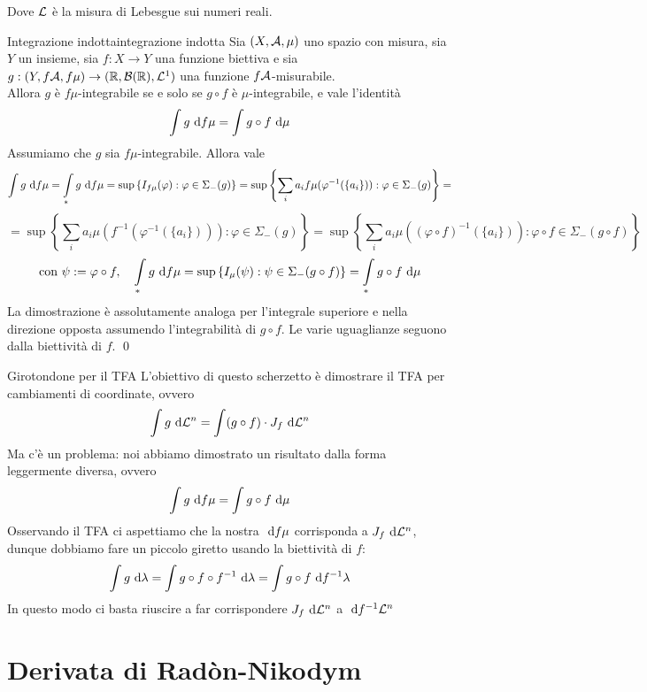 \documentclass{article}
\begin{document}
Dove $\mathcal{L}$ è la misura di Lebesgue sui numeri reali.

\begin{theorem}{Integrazione indotta}{integrazione indotta}
    Sia $(X,\mathcal{A},\mu)$ uno spazio con misura, sia $Y$ un insieme, sia $f:X\to Y$ una funzione biettiva e sia $g:(Y,f\mathcal{A},f\mu)\to (\mathbb{R},\mathcal{B}(\mathbb{R}),\mathcal{L}^1)$ una funzione $f\mathcal{A}$-misurabile.\\
    Allora $g$ è $f\mu$-integrabile se e solo se $g\circ f$ è $\mu$-integrabile, e vale l'identità
    \[\intop g \de f\mu = \intop g\circ f \de \mu\]
    \proof
    Assumiamo che $g$ sia $f\mu$-integrabile. Allora vale
    \[\intop g \de f\mu = \intop_* g \de f\mu = \sup\left\{I_{f\mu}(\varphi) : \varphi \in \Sigma_-(g)\right\}=\sup\left\{ \sum_i a_i f\mu(\varphi^{-1}(\{a_i\})) : \varphi \in \Sigma_-(g) \right\} =\]
    \[ = \sup\left\{ \sum_i a_i \mu(f^{-1}(\varphi^{-1}(\{a_i\}))) : \varphi \in \Sigma_-(g) \right\} = \sup\left\{ \sum_i a_i \mu((\varphi \circ f)^{-1}(\{a_i\})) : \varphi \circ f \in \Sigma_-(g\circ f) \right\}\]
    \[\text{con } \psi := \varphi \circ f, \quad \intop_* g \de f\mu =\sup\left\{ I_\mu(\psi) : \psi \in \Sigma_-(g\circ f) \right\} = \intop_* g \circ f \de \mu\]
    La dimostrazione è assolutamente analoga per l'integrale superiore e nella direzione opposta assumendo l'integrabilità di $g\circ f$. Le varie uguaglianze seguono dalla biettività di $f$.
    \qed
\end{theorem}

\begin{remark}{Girotondone per il TFA}{}
    L'obiettivo di questo scherzetto è dimostrare il TFA per cambiamenti di coordinate, ovvero
    \[\intop g \de \L^n = \intop (g \circ f)\cdot J_f \de \L^n  \]
    Ma c'è un problema: noi abbiamo dimostrato un risultato dalla forma leggermente diversa, ovvero 
    \[\intop g \de f\mu = \intop g\circ f \de \mu \]
    Osservando il TFA ci aspettiamo che la nostra $\text{ d} f\mu$ corrisponda a $J_f \text{ d} \mathcal{L}^n$, dunque dobbiamo fare un piccolo giretto usando la biettività di $f$:
    \[\intop g \de \lambda = \intop g \circ f \circ f^{-1} \de \lambda = \intop g \circ f \de f^{-1}\lambda\]
    In questo modo ci basta riuscire a far corrispondere $J_f \text{ d} \mathcal{L}^n$ a $\text{ d} f^{-1} \mathcal{L}^n$
\end{remark}

\pagebreak
\section{Derivata di Radòn-Nikodym}
\end{document}
